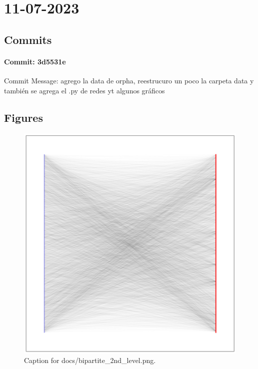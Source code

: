 \documentclass{article}
\begin{document}
\section{11-07-2023}
\subsection{Commits}
\paragraph{Commit: 3d5531e}
Commit Message: agrego la data de orpha, reestrucuro un poco la carpeta data y también se agrega el .py de redes yt algunos gráficos

\subsection{Figures}
\begin{figure}[h] \centering \includegraphics{docs/bipartite_2nd_level.png} \caption{Caption for docs/bipartite_2nd_level.png.} \end{figure}
\end{document}

